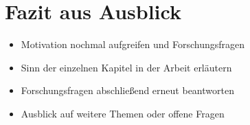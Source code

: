\chapter{Fazit aus Ausblick}
\label{Fazit}

\begin{itemize}
    \item Motivation nochmal aufgreifen und Forschungsfragen
    \item Sinn der einzelnen Kapitel in der Arbeit erläutern
    \item Forschungsfragen abschließend erneut beantworten
    \item Ausblick auf weitere Themen oder offene Fragen
\end{itemize}